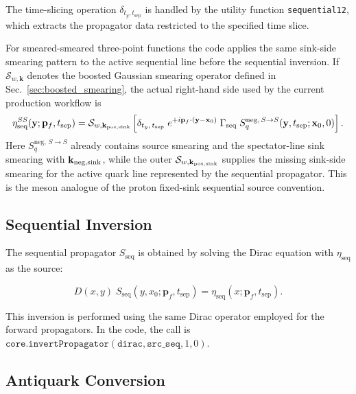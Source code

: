 \documentclass[11pt,a4paper]{article}
\newcommand{\gseq}{\Gamma_{\text{seq}}}
\newcommand{\Sq}{S_{q}}
\newcommand{\Sseq}{S_{\text{seq}}}
\newcommand{\etaseq}{\eta_{\text{seq}}}
\begin{document}
The time-slicing operation \(\delta_{t_y,t_{\text{sep}}}\) is handled by the
utility function \texttt{sequential12}, which extracts the propagator data
restricted to the specified time slice.

For smeared-smeared three-point functions the code applies the same sink-side
smearing pattern to the active sequential line before the sequential inversion.
If \(\mathcal{S}_{w,\mathbf{k}}\) denotes the boosted Gaussian smearing
operator defined in Sec.~\ref{sec:boosted_smearing}, the actual right-hand side
used by the current production workflow is
\begin{equation}
\etaseq^{SS}(\mathbf{y}; \mathbf{p}_f, t_{\text{sep}})
  =
  \mathcal{S}_{w,\mathbf{k}_{\rm pos,sink}}
  \left[
    \delta_{t_y,\,t_{\text{sep}}} \;
    e^{+i\mathbf{p}_f\cdot(\mathbf{y}-\mathbf{x}_0)} \;
    \gseq \;
    \Sq^{\text{neg},\,S\to S}
      (\mathbf{y}, t_{\text{sep}}; \mathbf{x}_0, 0)
  \right] .
\label{eq:etaseq_smeared}
\end{equation}
Here \(\Sq^{\text{neg},\,S\to S}\) already contains source smearing and the
spectator-line sink smearing with \(\mathbf{k}_{\rm neg,sink}\), while the
outer \(\mathcal{S}_{w,\mathbf{k}_{\rm pos,sink}}\) supplies the missing
sink-side smearing for the active quark line represented by the sequential
propagator.  This is the meson analogue of the proton fixed-sink sequential
source convention.

\subsection{Sequential Inversion}

The sequential propagator \(\Sseq\) is obtained by solving the Dirac equation
with \(\etaseq\) as the source:

\begin{equation}
D(x, y) \; \Sseq(y, x_0; \mathbf{p}_f, t_{\text{sep}}) = \etaseq(x; \mathbf{p}_f, t_{\text{sep}}) .
\label{eq:D_Sseq}
\end{equation}

This inversion is performed using the same Dirac operator employed for the
forward propagators.  In the code, the call is
\(\texttt{core.invertPropagator}(\texttt{dirac}, \texttt{src\_seq}, 1, 0)\).

\subsection{Antiquark Conversion}
\end{document}
